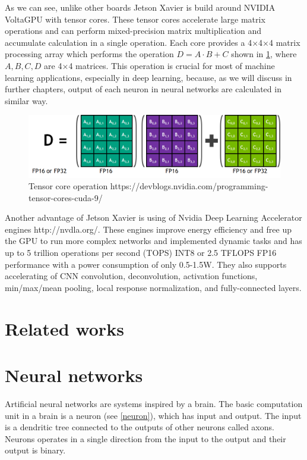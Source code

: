 \documentclass[twoside]{ctuthesis}
\theoremstyle{plain}
\theoremstyle{definition}
\theoremstyle{note}
\begin{document}
As we can see, unlike other boards Jetson Xavier is build around NVIDIA Volta\texttrademark GPU with tensor cores. These tensor cores accelerate large matrix operations and can perform mixed-precision matrix multiplication and accumulate calculation in a single operation. Each core  provides a 4$\times$4$\times$4 matrix processing array which performs the operation $D = A \cdot B+C$ shown in \ref{tensor_core}, where $A,B,C,D$ are 4$\times$4 matrices. This operation is crucial for most of machine learning applications, especially in deep learning, because, as we will discuss in further chapters, output of each neuron in neural networks are calculated in similar way. 


\begin{figure}[h]
\caption{Tensor core operation https://devblogs.nvidia.com/programming-tensor-cores-cuda-9/}
\label{tensor_core}
\includegraphics[width=\textwidth]{images/introduction/tensor_core.png}
\end{figure}

Another advantage of Jetson Xavier is using of Nvidia Deep Learning Accelerator engines http://nvdla.org/. These engines improve energy efficiency and free up the GPU to run more complex networks and implemented dynamic tasks  and has up to 5 trillion operations per second (TOPS) INT8 or 2.5 TFLOPS FP16 performance with a power consumption of only 0.5-1.5W. They also supports accelerating of CNN convolution, deconvolution, activation functions, min/max/mean pooling, local response normalization, and fully-connected layers.


\chapter{Related works}
\chapter{Neural networks}
Artificial neural networks are systems inspired by a brain.	The basic computation unit in a brain is a neuron (see \ref{neuron}), which has input and output. The input is a dendritic tree connected to the outputs of other neurons called axons. Neurons operates in a single direction from the input to the output and their output is binary.	 
\end{document}
